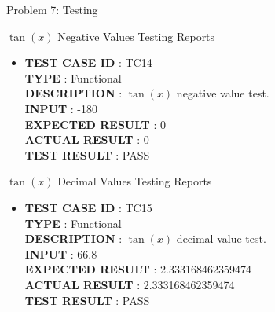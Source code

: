 \documentclass[a4paper,12pt]{article}
\begin{document}
\begin{section}{Problem 7: Testing}
\begin{subsubsection}{$\tan(x)$ Negative Values Testing Reports}
\begin{itemize}
\item \textbf{TEST CASE ID} \hspace{1.25cm} : TC14 \\
\textbf{TYPE } \hspace{3.15cm}  : Functional\\
\textbf{DESCRIPTION }\hspace{1.25cm} : $\tan(x)$ negative value test. \\
\textbf{INPUT} \hspace{3.05cm} :  -180 \\
\textbf{EXPECTED RESULT} \hspace{0.01cm} : 0 \\
\textbf{ACTUAL RESULT} \hspace{0.6cm} : 0 \\
\textbf{TEST RESULT} \hspace{1.40cm} : PASS \\

\end{itemize}
\end{subsubsection}

\vspace{1cm}
\begin{subsubsection}{$\tan(x)$ Decimal Values Testing Reports}
\begin{itemize}
\item \textbf{TEST CASE ID} \hspace{1.25cm} : TC15  \\
\textbf{TYPE } \hspace{3.15cm}  : Functional\\
\textbf{DESCRIPTION }\hspace{1.25cm} : $\tan(x)$ decimal value test. \\
\textbf{INPUT} \hspace{3.05cm} :  66.8 \\
\textbf{EXPECTED RESULT} \hspace{0.01cm} : 2.333168462359474 \\
\textbf{ACTUAL RESULT} \hspace{0.6cm} : 2.333168462359474  \\
\textbf{TEST RESULT} \hspace{1.40cm} : PASS \\


\end{itemize}
\end{subsubsection}
\end{section}
\end{document}
